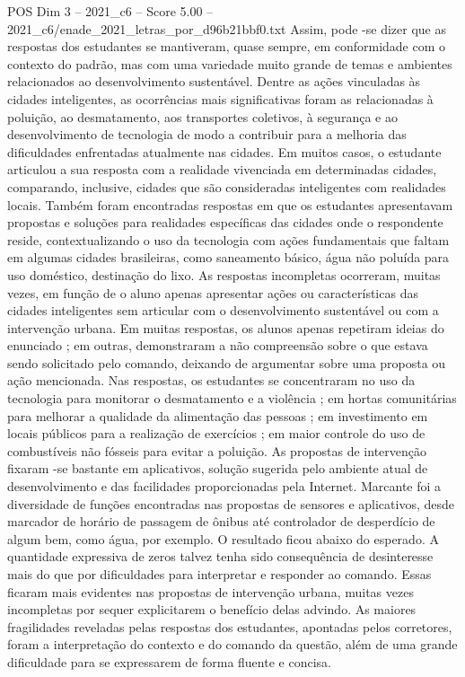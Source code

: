\begin{textsample}{POS Dim 3 – 2021\_c6 – Score 5.00 – 2021\_c6/enade\_2021\_letras\_por\_d96b21bbf0.txt}
Assim, pode -se dizer que as respostas dos estudantes se mantiveram, quase sempre, em conformidade com o contexto do padrão, mas com uma variedade muito grande de temas e ambientes relacionados ao desenvolvimento sustentável.
Dentre as ações vinculadas às cidades inteligentes, as ocorrências mais significativas foram as relacionadas à poluição, ao desmatamento, aos transportes coletivos, à segurança e ao desenvolvimento de tecnologia de modo a contribuir para a melhoria das dificuldades enfrentadas atualmente nas cidades.
Em muitos casos, o estudante articulou a sua resposta com a realidade vivenciada em determinadas cidades, comparando, inclusive, cidades que são consideradas inteligentes com realidades locais.
Também foram encontradas respostas em que os estudantes apresentavam propostas e soluções para realidades específicas das cidades onde o respondente reside, contextualizando o uso da tecnologia com ações fundamentais que faltam em algumas cidades brasileiras, como saneamento básico, água não poluída para uso doméstico, destinação do lixo.
As respostas incompletas ocorreram, muitas vezes, em função de o aluno apenas apresentar ações ou características das cidades inteligentes sem articular com o desenvolvimento sustentável ou com a intervenção urbana.
Em muitas respostas, os alunos apenas repetiram ideias do enunciado ; em outras, demonstraram a não compreensão sobre o que estava sendo solicitado pelo comando, deixando de argumentar sobre uma proposta ou ação mencionada.
Nas respostas, os estudantes se concentraram no uso da tecnologia para monitorar o desmatamento e a violência ; em hortas comunitárias para melhorar a qualidade da alimentação das pessoas ; em investimento em locais públicos para a realização de exercícios ; em maior controle do uso de combustíveis não fósseis para evitar a poluição.
As propostas de intervenção fixaram -se bastante em aplicativos, solução sugerida pelo ambiente atual de desenvolvimento e das facilidades proporcionadas pela Internet.
Marcante foi a diversidade de funções encontradas nas propostas de sensores e aplicativos, desde marcador de horário de passagem de ônibus até controlador de desperdício de algum bem, como água, por exemplo.
O resultado ficou abaixo do esperado.
A quantidade expressiva de zeros talvez tenha sido consequência de desinteresse mais do que por dificuldades para interpretar e responder ao comando.
Essas ficaram mais evidentes nas propostas de intervenção urbana, muitas vezes incompletas por sequer explicitarem o benefício delas advindo.
As maiores fragilidades reveladas pelas respostas dos estudantes, apontadas pelos corretores, foram a interpretação do contexto e do comando da questão, além de uma grande dificuldade para se expressarem de forma fluente e concisa.

\end{textsample}
